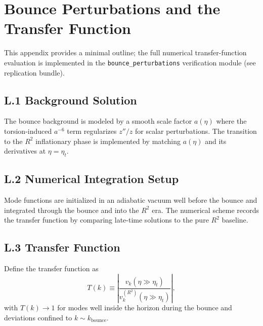 \section{Bounce Perturbations and the Transfer Function}
\label{app:bounce}

\begin{tcolorbox}[colback=gray!5, colframe=gray!60, 
    title={\textbf{Status Note}}, fonttitle=\bfseries\small]
This appendix provides a minimal outline; the full numerical transfer-function evaluation
is implemented in the \texttt{bounce\_perturbations} verification module (see replication bundle).
\end{tcolorbox}

\subsection{L.1 Background Solution}
The bounce background is modeled by a smooth scale factor $a(\eta)$ where the torsion-induced
$a^{-6}$ term regularizes $z''/z$ for scalar perturbations. The transition to the $R^2$
inflationary phase is implemented by matching $a(\eta)$ and its derivatives at $\eta=\eta_t$.

\subsection{L.2 Numerical Integration Setup}
Mode functions are initialized in an adiabatic vacuum well before the bounce and integrated
through the bounce and into the $R^2$ era. The numerical scheme records the transfer function
by comparing late-time solutions to the pure $R^2$ baseline.

\subsection{L.3 Transfer Function}
Define the transfer function as
\begin{equation}
    T(k) \equiv \left|\frac{v_k(\eta\gg \eta_t)}{v_k^{(R^2)}(\eta\gg \eta_t)}\right|,
\end{equation}
with $T(k)\to 1$ for modes well inside the horizon during the bounce and deviations confined
to $k\sim k_{\text{bounce}}$.


